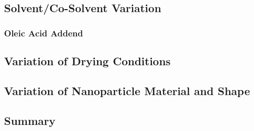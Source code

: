 \documentclass[\main/dresen_thesis.tex]{subfiles}
\renewcommand{\thisPath}{\main/chapters/monolayers/preparationMonolayers}
\begin{document}

    \subsection{Solvent/Co-Solvent Variation}
      
      \FloatBarrier
      \subsubsection{Oleic Acid Addend}
        
        \FloatBarrier

    \subsection{Variation of Drying Conditions}
      
      \FloatBarrier

    \subsection{Variation of Nanoparticle Material and Shape}
      
      \FloatBarrier

    \subsection{Summary}
      
      \FloatBarrier
\end{document}
